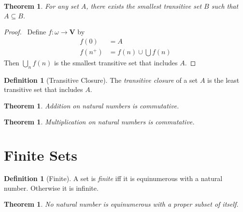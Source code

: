 \documentclass{report}
\let\qed\relax
\newtheorem{theorem}[axiom]{Theorem}
\theoremstyle{definition}
\newtheorem{definition}[axiom]{Definition}
\begin{document}
    \begin{theorem}
        For any set $A$, there exists the smallest transitive set $B$ such that $A \subseteq B$.
    \end{theorem}

    \begin{proof}
        \pf\ Define $f : \omega \rightarrow \mathbf{V}$ by
        \begin{align*}
            f(0) & = A \\
            f(n^+) & = f(n) \cup \bigcup f(n)
        \end{align*}
        Then $\bigcup_n f(n)$ is the smallest transitive set that includes $A$. \qed
    \end{proof}

    \begin{definition}[Transitive Closure]
        The \emph{transitive closure} of a set $A$ is the least transitive set that includes $A$.
    \end{definition}

    \begin{theorem}
        Addition on natural numbers is commutative.
    \end{theorem}

    \begin{theorem}
        Multiplication on natural numbers is commutative.
    \end{theorem}

    \section{Finite Sets}

    \begin{definition}[Finite]
        A set is \emph{finite} iff it is equinumerous with a natural number. Otherwise it is infinite.
    \end{definition}

    \begin{theorem}
        No natural number is equinumerous with a proper subset of itself.
    \end{theorem}
\end{document}
